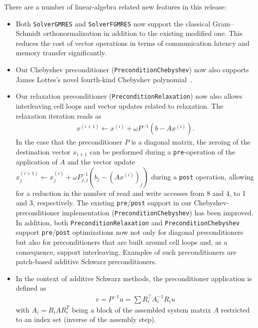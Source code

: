 \documentclass{ansarticle-preprint}
\begin{document}
There are a number of linear-algebra related new features in this release:
\begin{itemize}
  \item Both \texttt{SolverGMRES} and \texttt{SolverFGMRES} now support the classical
  Gram--Schmidt orthonormalization in addition to the existing modified one. This
  reduces the cost of vector operations in terms of
  communication latency and memory transfer significantly.
  \item Our Chebyshev preconditioner (\texttt{PreconditionChebyshev}) now also
  supports James Lottes’s novel fourth-kind Chebyshev
  polynomial~\cite{lottes2022optimal, phillips2022optimal}.
  \item Our relaxation preconditioner (\texttt{PreconditionRelaxation}) now also
  allows interleaving cell loops and vector updates related to relaxation. The
  relaxation iteration reads as
  \begin{align*}
  x^{(i+1)} \gets x^{(i)} + \omega P^{-1}(b-Ax^{(i)}).
  \end{align*}
  In the case that the preconditioner $P$ is a diagonal matrix, the zeroing of
  the destination vector $x_{i+1}$ can be performed during a
  \texttt{pre}-operation  of the application of $A$
  and the vector update $x^{(i+1)}_j \gets x^{(i)}_j + \omega P^{-1}_{j,j}(b_j-(Ax^{(i)})_j)$
  during a \texttt{post} operation, allowing for a reduction in the number of read and write
  accesses from 8 and 4, to 1 and 3, respectively. The existing \texttt{pre}/\texttt{post}
  support in our Chebyshev-preconditioner implementation (\texttt{PreconditionChebyshev})
  has been improved. In addition, both \texttt{PreconditionRelaxation} and 
  \texttt{PreconditionChebyshev} support \texttt{pre}/\texttt{post} optimizations
  now not only for diagonal preconditioners but also for preconditioners that are
  built around cell loops and, as a consequence, support interleaving. Examples of
  such preconditioners are patch-based additive Schwarz preconditioners.
  \item In the context of additive Schwarz methods, the preconditioner application
  is defined as
  \begin{align*}
  v = P^{-1} u = \sum R_i^\top A_i^{-1} R_i u 
  \end{align*}
  with $A_i = R_i A R_i^T$ being a block of the assembled system
  matrix $A$ restricted
  to an index set (inverse of the assembly step).
\end{itemize}
\end{document}
